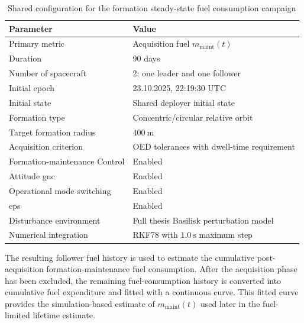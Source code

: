 \begin{table}[H]
    \centering
    \caption{Shared configuration for the formation steady-state fuel consumption campaign}
    \label{tab:steady_state_campaign_shared_config}
    \begin{tabular}{ll}
        \toprule
        \textbf{Parameter} & \textbf{Value} \\
        \midrule
        Primary metric & Acquisition fuel $m_{\mathrm{maint}}(t)$ \\
        Duration & 90 days \\
        Number of spacecraft & 2: one leader and one follower \\
        Initial epoch & 23.10.2025,  22:19:30 UTC \\
        Initial state & Shared deployer initial state \\
        Formation type & Concentric/circular relative orbit \\
        Target formation radius & $400~\mathrm{m}$ \\
        Acquisition criterion & OED tolerances with dwell-time requirement \\
        Formation-maintenance Control & Enabled \\
        Attitude \gls{gnc} & Enabled \\
        Operational mode switching & Enabled \\
        \gls{eps} & Enabled \\
        Disturbance environment & Full thesis Basilisk perturbation model \\
        Numerical integration & RKF78 with $1.0~\mathrm{s}$ maximum step \\
        \bottomrule
    \end{tabular}
\end{table}

The resulting follower fuel history is used to estimate the cumulative post-acquisition formation-maintenance fuel consumption. After the acquisition phase has been excluded, the remaining fuel-consumption history is converted into cumulative fuel expenditure and fitted with a continuous curve. This fitted curve provides the simulation-based estimate of $m_{\mathrm{maint}}(t)$ used later in the fuel-limited lifetime estimate.










